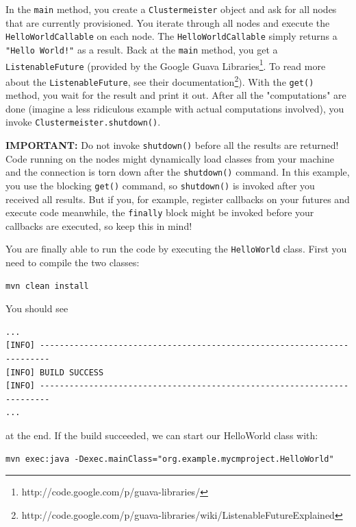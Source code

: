 \documentclass{article}
\begin{document}
In the \texttt{main} method, you create a \texttt{Clustermeister} object and ask for all nodes that are currently provisioned. You iterate through all nodes and execute the \texttt{HelloWorldCallable} on each node. The \texttt{HelloWorldCallable} simply returns a \texttt{"Hello World!"} as a result. Back at the \texttt{main} method, you get a \texttt{ListenableFuture} (provided by the Google Guava Libraries\footnote{http://code.google.com/p/guava-libraries/}. To read more about the \texttt{ListenableFuture}, see their documentation\footnote{http://code.google.com/p/guava-libraries/wiki/ListenableFutureExplained}). With the \texttt{get()} method, you wait for the result and print it out. After all the "computations" are done (imagine a less ridiculous example with actual computations involved), you invoke \texttt{Clustermeister.shutdown()}.

\textbf{IMPORTANT:} Do not invoke \texttt{shutdown()} before all the results are returned! Code running on the nodes might dynamically load classes from your machine and the connection is torn down after the \texttt{shutdown()} command. In this example, you use the blocking \texttt{get()} command, so \texttt{shutdown()} is invoked after you received all results. But if you, for example, register callbacks on your futures and execute code meanwhile, the \texttt{finally} block might be invoked before your callbacks are executed, so keep this in mind!

You are finally able to run the code by executing the \texttt{HelloWorld} class. First you need to compile the two classes:

\begin{lstlisting}[breaklines=true, backgroundcolor=\color{lbcolor}]
mvn clean install
\end{lstlisting}

You should see

\begin{lstlisting}[breaklines=true, backgroundcolor=\color{lbcolor}]
...
[INFO] ------------------------------------------------------------------------
[INFO] BUILD SUCCESS
[INFO] ------------------------------------------------------------------------
...
\end{lstlisting}

at the end. If the build succeeded, we can start our HelloWorld class with:

\begin{lstlisting}[breaklines=true, backgroundcolor=\color{lbcolor}]
mvn exec:java -Dexec.mainClass="org.example.mycmproject.HelloWorld"
\end{lstlisting}
\end{document}
